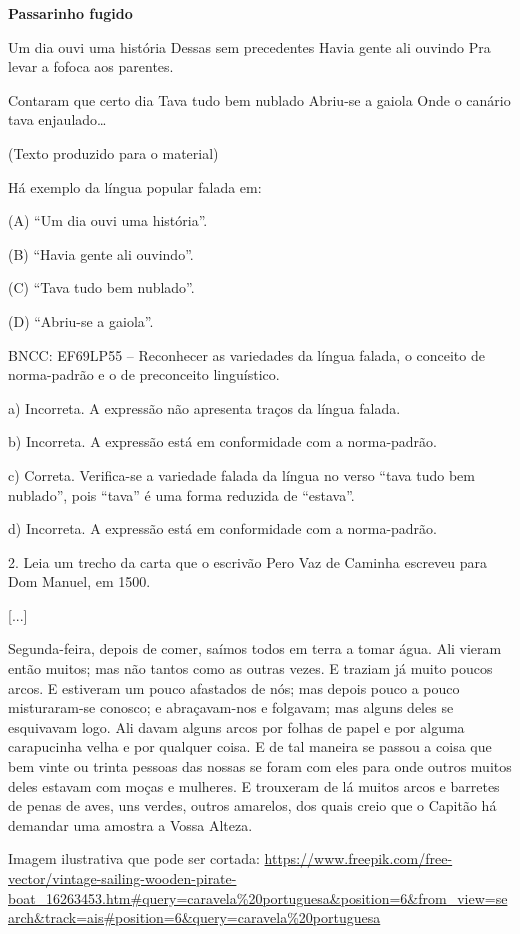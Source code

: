 \begin{itemize}
\begin{itemize}
{\begin{itemize}
\begin{itemize}
\textbf{Passarinho fugido}

Um dia ouvi uma história Dessas sem precedentes Havia gente ali ouvindo
Pra levar a fofoca aos parentes.

Contaram que certo dia Tava tudo bem nublado Abriu-se a gaiola Onde o
canário tava enjaulado\ldots{}

(Texto produzido para o material)

Há exemplo da língua popular falada em:

(A) ``Um dia ouvi uma história''.

(B) ``Havia gente ali ouvindo''.

(C) ``Tava tudo bem nublado''.

(D) ``Abriu-se a gaiola''.

BNCC: EF69LP55 -- Reconhecer as variedades da língua falada, o conceito
de norma-padrão e o de preconceito linguístico.

a) Incorreta. A expressão não apresenta traços da língua falada.

b) Incorreta. A expressão está em conformidade com a norma-padrão.

c) Correta. Verifica-se a variedade falada da língua no verso ``tava
tudo bem nublado'', pois ``tava'' é uma forma reduzida de ``estava''.

d) Incorreta. A expressão está em conformidade com a norma-padrão.

2. Leia um trecho da carta que o escrivão Pero Vaz de Caminha escreveu
para Dom Manuel, em 1500.

{[}...{]}

Segunda-feira, depois de comer, saímos todos em terra a tomar água. Ali
vieram então muitos; mas não tantos como as outras vezes. E traziam já
muito poucos arcos. E estiveram um pouco afastados de nós; mas depois
pouco a pouco misturaram-se conosco; e abraçavam-nos e folgavam; mas
alguns deles se esquivavam logo. Ali davam alguns arcos por folhas de
papel e por alguma carapucinha velha e por qualquer coisa. E de tal
maneira se passou a coisa que bem vinte ou trinta pessoas das nossas se
foram com eles para onde outros muitos deles estavam com moças e
mulheres. E trouxeram de lá muitos arcos e barretes de penas de aves,
uns verdes, outros amarelos, dos quais creio que o Capitão há demandar
uma amostra a Vossa Alteza.

Imagem ilustrativa que pode ser cortada:
\url{https://www.freepik.com/free-vector/vintage-sailing-wooden-pirate-boat_16263453.htm\#query=caravela\%20portuguesa\&position=6\&from_view=search\&track=ais\#position=6\&query=caravela\%20portuguesa}


\end{itemize}
\end{itemize}}
\end{itemize}
\end{itemize}
